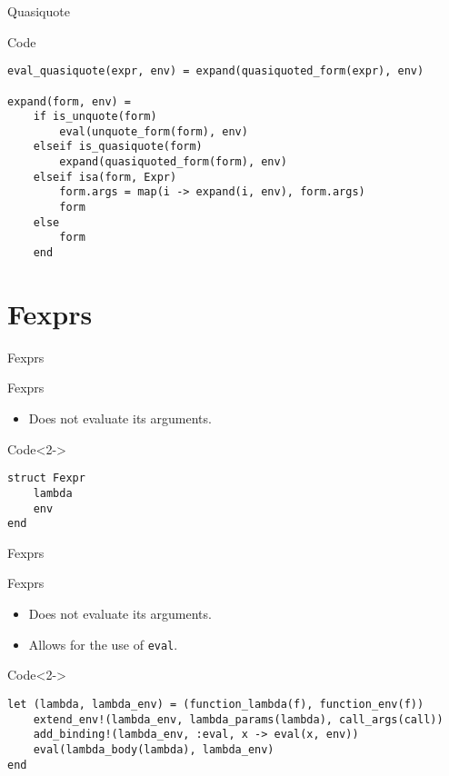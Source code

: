 \documentclass[aspectratio=169]{beamer}
\begin{document}
\begin{frame}[fragile]{Quasiquote}
    \begin{exampleblock}{Code}
        \footnotesize \begin{verbatim}
eval_quasiquote(expr, env) = expand(quasiquoted_form(expr), env)

expand(form, env) =
    if is_unquote(form)
        eval(unquote_form(form), env)
    elseif is_quasiquote(form)
        expand(quasiquoted_form(form), env)
    elseif isa(form, Expr)
        form.args = map(i -> expand(i, env), form.args)
        form
    else
        form
    end\end{verbatim}
    \end{exampleblock}
\end{frame}

\section{Fexprs}
\begin{frame}[fragile]{Fexprs}
    \begin{block}{Fexprs}
        \begin{itemize}
            \item<1-> Does not evaluate its arguments.
        \end{itemize}
    \end{block}
    \begin{exampleblock}{Code}<2->
        \footnotesize \begin{verbatim}
struct Fexpr
    lambda
    env
end\end{verbatim}
    \end{exampleblock}
\end{frame}

\begin{frame}[fragile]{Fexprs}
    \begin{block}{Fexprs}
        \begin{itemize}
            \item Does not evaluate its arguments.
            \item Allows for the use of \texttt{eval}.
        \end{itemize}
    \end{block}
    \begin{exampleblock}{Code}<2->
        \footnotesize \begin{verbatim}
let (lambda, lambda_env) = (function_lambda(f), function_env(f))
    extend_env!(lambda_env, lambda_params(lambda), call_args(call))
    add_binding!(lambda_env, :eval, x -> eval(x, env))
    eval(lambda_body(lambda), lambda_env)
end\end{verbatim}
    \end{exampleblock}
\end{frame}
\end{document}
